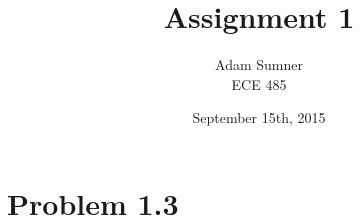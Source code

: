 \documentclass[]{article}
\title{\textbf{Assignment 1}}
\author{Adam Sumner\\ECE 485}
\date{September 15th, 2015}
\begin{document}
\maketitle

\section*{Problem 1.3}
\end{document}
